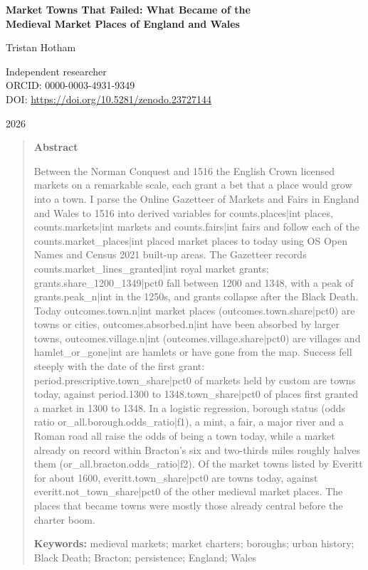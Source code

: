 \documentclass[11pt,a4paper]{article}
\begin{document}
\begin{center}
{\Large\bfseries Market Towns That Failed: What Became of the\\[2pt] Medieval Market Places of England and Wales\par}
\vspace{1.2em}
{\large Tristan Hotham\par}
\vspace{0.3em}
{\small Independent researcher\\
ORCID: 0000-0003-4931-9349\\
DOI: \href{https://doi.org/10.5281/zenodo.23727144}{https://doi.org/10.5281/zenodo.23727144}\par}
\vspace{0.8em}
2026
\end{center}

\begin{quote}
\small
\begin{center}\textbf{Abstract}\end{center}
Between the Norman Conquest and 1516 the English Crown licensed markets on a remarkable scale, each grant a bet that a place would grow into a town. I parse the Online Gazetteer of Markets and Fairs in England and Wales to 1516 into derived variables for {{counts.places|int}} places, {{counts.markets|int}} markets and {{counts.fairs|int}} fairs and follow each of the {{counts.market_places|int}} placed market places to today using OS Open Names and Census 2021 built-up areas. The Gazetteer records {{counts.market_lines_granted|int}} royal market grants; {{grants.share_1200_1349|pct0}} fall between 1200 and 1348, with a peak of {{grants.peak_n|int}} in the 1250s, and grants collapse after the Black Death. Today {{outcomes.town.n|int}} market places ({{outcomes.town.share|pct0}}) are towns or cities, {{outcomes.absorbed.n|int}} have been absorbed by larger towns, {{outcomes.village.n|int}} ({{outcomes.village.share|pct0}}) are villages and {{hamlet_or_gone|int}} are hamlets or have gone from the map. Success fell steeply with the date of the first grant: {{period.prescriptive.town_share|pct0}} of markets held by custom are towns today, against {{period.1300 to 1348.town_share|pct0}} of places first granted a market in 1300 to 1348. In a logistic regression, borough status (odds ratio {{or_all.borough.odds_ratio|f1}}), a mint, a fair, a major river and a Roman road all raise the odds of being a town today, while a market already on record within Bracton's six and two-thirds miles roughly halves them ({{or_all.bracton.odds_ratio|f2}}). Of the market towns listed by Everitt for about 1600, {{everitt.town_share|pct0}} are towns today, against {{everitt.not_town_share|pct0}} of the other medieval market places. The places that became towns were mostly those already central before the charter boom.

\textbf{Keywords:} medieval markets; market charters; boroughs; urban history; Black Death; Bracton; persistence; England; Wales
\end{quote}
\end{document}
